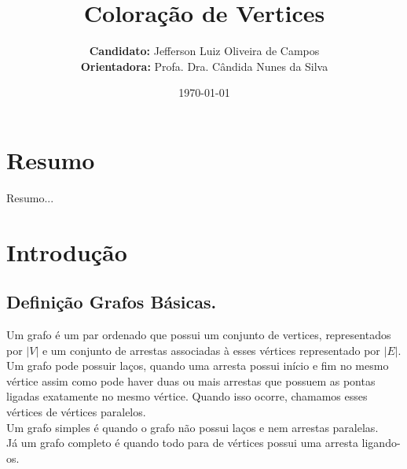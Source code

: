 \documentclass[12pt]{article}
\author{\textbf{Candidato:} Jefferson Luiz Oliveira de Campos\\
        \textbf{Orientadora:} Profa. Dra. Cândida Nunes da Silva}
\title{\textbf{Coloração de Vertices}}
\date{\today}
\begin{document}
\maketitle
\thispagestyle{empty}

\newpage
{}
\tableofcontents

\newpage
{}


\section{Resumo}

Resumo...

\section{Introdução}


\subsection{Definição Grafos Básicas.}
Um grafo é um par ordenado que possui um conjunto de vertices, representados por $|V|$ e um conjunto de arrestas associadas à esses vértices representado por $|E|$.\\

Um grafo pode possuir laços, quando uma arresta possui início e fim no mesmo vértice assim como pode haver duas ou mais arrestas que possuem as pontas ligadas exatamente no mesmo vértice. Quando isso ocorre, chamamos esses vértices de vértices paralelos.\\

Um grafo simples é quando o grafo não possui laços e nem arrestas paralelas.\\ Já um grafo completo é quando todo para de vértices possui uma arresta ligando-os.\\
\end{document}
